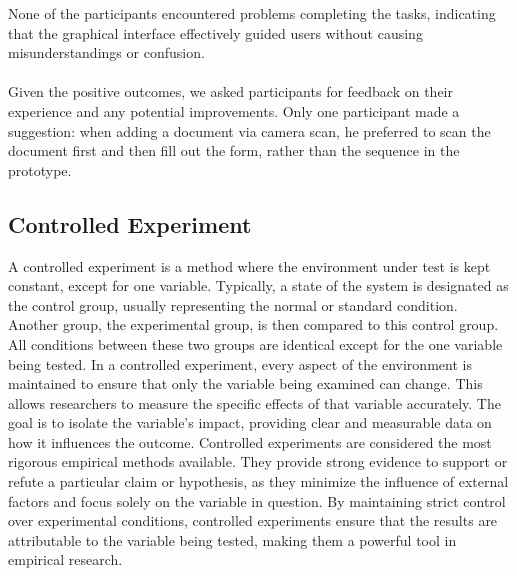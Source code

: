 	\noindent
	None of the participants encountered problems completing the tasks, indicating that the graphical interface effectively guided users without causing misunderstandings or confusion.\\\\
	Given the positive outcomes, we asked participants for feedback on their experience and any potential improvements. Only one participant made a suggestion: when adding a document via camera scan, he preferred to scan the document first and then fill out the form, rather than the sequence in the prototype.	
	
	
	
	
	
	
	
	\subsection{Controlled Experiment}
	A controlled experiment is a method where the environment under test is kept constant, except for one variable. Typically, a state of the system is designated as the control group, usually representing the normal or standard condition. Another group, the experimental group, is then compared to this control group. All conditions between these two groups are identical except for the one variable being tested.\newline
	In a controlled experiment, every aspect of the environment is maintained to ensure that only the variable being examined can change. This allows researchers to measure the specific effects of that variable accurately. The goal is to isolate the variable's impact, providing clear and measurable data on how it influences the outcome.\newline
	Controlled experiments are considered the most rigorous empirical methods available. They provide strong evidence to support or refute a particular claim or hypothesis, as they minimize the influence of external factors and focus solely on the variable in question. By maintaining strict control over experimental conditions, controlled experiments ensure that the results are attributable to the variable being tested, making them a powerful tool in empirical research.
